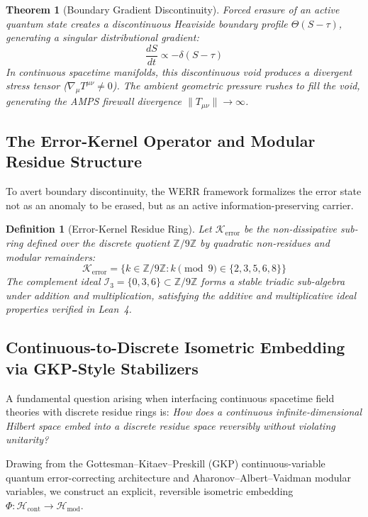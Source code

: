 \documentclass[11pt,a4paper]{article}
\newtheorem{theorem}{Theorem}
\newtheorem{definition}{Definition}
\begin{document}
\begin{theorem}[Boundary Gradient Discontinuity]
Forced erasure of an active quantum state creates a discontinuous Heaviside boundary profile $\Theta(S - \tau)$, generating a singular distributional gradient:
\begin{equation}
\frac{dS}{dt} \propto -\delta(S - \tau)
\end{equation}
In continuous spacetime manifolds, this discontinuous void produces a divergent stress tensor ($\nabla_\mu T^{\mu\nu} \neq 0$). The ambient geometric pressure rushes to fill the void, generating the AMPS firewall divergence $\|T_{\mu\nu}\| \to \infty$.
\end{theorem}

\subsection{The Error-Kernel Operator and Modular Residue Structure}\label{sec:kernel}
To avert boundary discontinuity, the WERR framework formalizes the error state not as an anomaly to be erased, but as an active information-preserving carrier.

\begin{definition}[Error-Kernel Residue Ring]
Let $\mathcal{K}_{\text{error}}$ be the non-dissipative sub-ring defined over the discrete quotient $\mathbb{Z}/9\mathbb{Z}$ by quadratic non-residues and modular remainders:
\begin{equation}
\mathcal{K}_{\text{error}} = \{ k \in \mathbb{Z}/9\mathbb{Z} : k \pmod 9 \in \{2, 3, 5, 6, 8\} \}
\end{equation}
The complement ideal $\mathcal{I}_3 = \{0, 3, 6\} \subset \mathbb{Z}/9\mathbb{Z}$ forms a stable triadic sub-algebra under addition and multiplication, satisfying the additive and multiplicative ideal properties verified in Lean~4.
\end{definition}

\subsection{Continuous-to-Discrete Isometric Embedding via GKP-Style Stabilizers}\label{sec:embedding}
A fundamental question arising when interfacing continuous spacetime field theories with discrete residue rings is: \emph{How does a continuous infinite-dimensional Hilbert space embed into a discrete residue space reversibly without violating unitarity?}

Drawing from the Gottesman--Kitaev--Preskill (GKP) continuous-variable quantum error-correcting architecture \cite{gkp2001} and Aharonov--Albert--Vaidman modular variables, we construct an explicit, reversible isometric embedding $\Phi: \mathcal{H}_{\text{cont}} \to \mathcal{H}_{\text{mod}}$.
\end{document}
